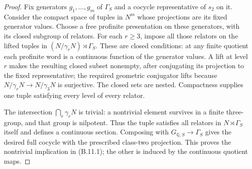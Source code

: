 \begin{proof}
Fix generators $g_1,\ldots,g_m$ of $\Gamma_S$ and
a cocycle representative of $s_2$ on it.
Consider the compact space of tuples in $N^m$
whose projections are its fixed generator values.
Choose a free profinite presentation on these
generators, with its closed subgroup of relators.
For each $r\ge3$, impose all those relators on
the lifted tuples in
$(N/\gamma_rN)\rtimes\Gamma_S$.
These are closed conditions: at any finite quotient
each profinite word is a continuous function of
the generator values.  A lift at level $r$ makes
the resulting closed subset nonempty, after
conjugating its projection to the fixed representative;
the required geometric conjugator lifts because
$N/\gamma_rN\to N/\gamma_3N$ is surjective.
The closed sets are nested.  Compactness supplies
one tuple satisfying every level of every relator.

The intersection $\bigcap_r\gamma_rN$ is trivial:
a nontrivial element survives in a finite three-group,
and that group is nilpotent.  Thus the tuple satisfies
all relators in $N\rtimes\Gamma_S$ itself and defines
a continuous section.  Composing with
$G_{\mathbb Q,S}\to\Gamma_S$ gives the desired full
cocycle with the prescribed class-two projection.
This proves the nontrivial implication in (B.11.1);
the other is induced by the continuous quotient maps.
\end{proof}

